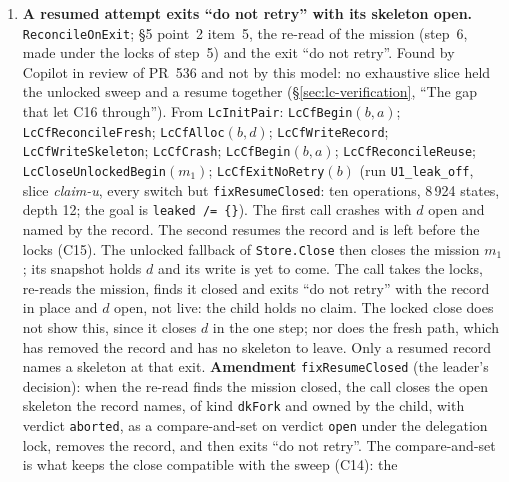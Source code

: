 \documentclass[a4paper,10pt,fleqn]{article}
\newcommand{\field}[1]{\texttt{#1}}
\begin{document}
\begin{enumerate}
    (run \texttt{Fa\_lockw\_off}): a write of the phase made with the step~5 locks
    not held. \textbf{Amendment} \field{fixReuseLocks}: the resume leaves the
    call at the stage before the allocation; \field{LcCfLockReuse} takes the
    locks and re-reads the mission (and the call exits ``do not retry'' if it
    is closed); only then may the binding and the claim be written. The
    exclusion of \field{LcCloseLocked} is now a set of calls that hold the
    locks, \field{cfH}, and not a stage number.
  \item[\textbf{C16}] \textbf{A resumed attempt exits ``do not retry'' with
    its skeleton open.} \field{ReconcileOnExit}; \S5 point~2 item~5, the
    re-read of the mission (step~6, made under the locks of step~5) and the exit
    ``do not retry''. Found by Copilot in review of PR~536 and not by this
    model: no exhaustive slice held the unlocked sweep and a resume together
    (\S\ref{sec:lc-verification}, ``The gap that let C16 through''). From
    \field{LcInitPair}: \field{LcCfBegin}$(b,a)$; \field{LcCfReconcileFresh};
    \field{LcCfAlloc}$(b,d)$; \field{LcCfWriteRecord}; \field{LcCfWriteSkeleton};
    \field{LcCfCrash}; \field{LcCfBegin}$(b,a)$; \field{LcCfReconcileReuse};
    \field{LcCloseUnlockedBegin}$(m_1)$; \field{LcCfExitNoRetry}$(b)$ (run
    \texttt{U1\_leak\_off}, slice \emph{claim-u}, every switch but
    \field{fixResumeClosed}: ten operations, 8\,924 states, depth 12; the goal
    is \texttt{leaked /= \{\}}). The first call crashes with $d$ open and named by
    the record. The second resumes the record and is left before the locks
    (C15). The unlocked fallback of \field{Store.Close} then closes the mission
    $m_1$; its snapshot holds $d$ and its write is yet to come. The call takes
    the locks, re-reads the mission, finds it closed and exits ``do not retry''
    with the record in place and $d$ open, not live: the child holds no claim.
    The locked close does not show this, since it closes $d$ in the one step; nor
    does the fresh path, which has removed the record and has no skeleton to
    leave. Only a resumed record names a skeleton at that exit.
    \textbf{Amendment} \field{fixResumeClosed} (the leader's decision): when the
    re-read finds the mission closed, the call closes the open skeleton the
    record names, of kind \field{dkFork} and owned by the child, with verdict
    \field{aborted}, as a compare-and-set on verdict \field{open} under the
    delegation lock, removes the record, and then exits ``do not retry''. The
    compare-and-set is what keeps the close compatible with the sweep (C14): the

\end{enumerate}
\end{document}
